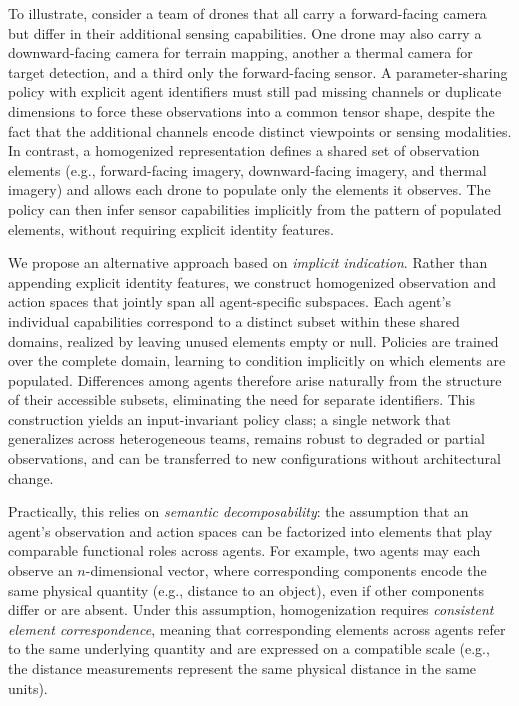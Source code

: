 To illustrate, consider a team of drones that all carry a forward-facing camera but 
differ in their additional sensing capabilities.
One drone may also carry a downward-facing camera for terrain mapping, 
another a thermal camera for target detection, and a third only the forward-facing sensor.
A parameter-sharing policy with explicit agent 
identifiers must still pad missing channels or duplicate dimensions 
to force these observations into a common tensor shape, despite the 
fact that the additional channels encode distinct viewpoints or sensing modalities.
In contrast, a homogenized representation defines a shared set of observation 
elements (e.g., forward-facing imagery, downward-facing imagery, and thermal imagery) 
and allows each drone to populate only the elements it observes.
The policy can then infer sensor capabilities implicitly from the pattern of 
populated elements, without requiring explicit identity features.

We propose an alternative approach based on \emph{implicit indication}. 
Rather than appending explicit identity features, we construct homogenized 
observation and action spaces that jointly span all agent-specific subspaces. 
Each agent's individual capabilities correspond to a distinct subset within 
these shared domains, realized by leaving unused elements empty or null. 
Policies are trained over the complete domain, 
learning to condition implicitly on which elements are populated. 
Differences among agents therefore arise naturally from the structure of 
their accessible subsets, eliminating the need for separate identifiers. 
This construction yields an input-invariant policy class;
a single network that generalizes across heterogeneous teams, 
remains robust to degraded or partial observations, 
and can be transferred to new configurations without architectural change.

Practically, this relies on \emph{semantic decomposability}: 
the assumption that an agent's observation and action spaces can be factorized
into elements that play comparable functional roles across agents.
For example, two agents may each observe an \(n\)-dimensional vector, 
where corresponding components encode the same physical quantity 
(e.g., distance to an object), even if other components differ or are absent.
Under this assumption, homogenization requires \emph{consistent element correspondence},
meaning that corresponding elements across agents refer to the same underlying quantity
and are expressed on a compatible scale (e.g., the distance measurements represent
the same physical distance in the same units).

